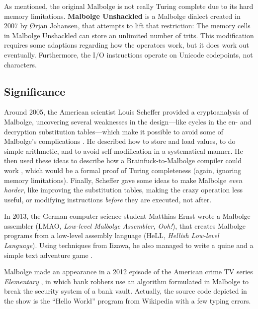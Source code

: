 As mentioned, the original Malbolge is not really Turing complete due to its hard memory limitations. \textbf{Malbolge Unshackled} is a Malbolge dialect created in 2007 by Ørjan Johansen, that attempts to lift that restriction: The memory cells in Malbolge Unshackled can store an unlimited number of trits. This modification requires some adaptions regarding how the operators work, but it does work out eventually. Furthermore, the I/O instructions operate on Unicode codepoints, not \ascii{} characters.

\subsection{Significance}

Around 2005, the American scientist Louis Scheffer provided a cryptoanalysis of Malbolge, uncovering several weaknesses in the design---like cycles in the en- and decryption substitution tables---which make it possible to avoid some of Malbolge's complications \cite{scheffer_introduction}. He described how to store and load values, to do simple arithmetic, and to avoid self-modification in a systematical manner. He then used these ideas to describe how a Brainfuck-to-Malbolge compiler could work \cite{scheffer_writing}, which would be a formal proof of Turing completeness (again, ignoring memory limitations). Finally, Scheffer gave some ideas to make Malbolge \emph{even harder}, like improving the substitution tables, making the crazy operation less useful, or modifying instructions \emph{before} they are executed, not after.

In 2013, the German computer science student Matthias Ernst wrote a Malbolge assembler (LMAO, \emph{Low-level Malbolge Assembler, Ooh!}), that creates Malbolge programs from a low-level assembly language (HeLL, \emph{Hellish Low-level Language}). Using techniques from Iizawa, he also managed to write a quine and a simple text adventure game \cite{ernst_malbolge}.

Malbolge made an appearance in a 2012 episode of the American crime TV series \emph{Elementary} \cite{hamilton2012esoteric}, in which bank robbers use an algorithm formulated in Malbolge to break the security system of a bank vault. Actually, the source code depicted in the show is the “Hello World” program from Wikipedia with a few typing errors.
